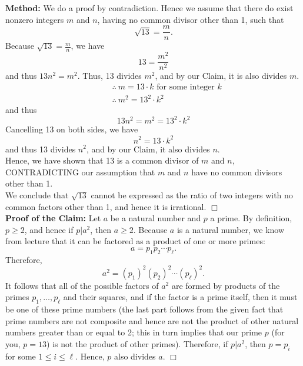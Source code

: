 \documentclass[letterpaper]{article}
\begin{document}
\noindent \textbf{Method:} We do a proof by contradiction. Hence we assume that there do exist nonzero integers ${m}$ and ${n}$, having no common divisor other than 1, such that
$$\sqrt{13}=\frac{{m}}{{n}}.$$
Because $\sqrt{13}=\frac{{m}}{{n}}$, we have
$$13=\frac{{m}^2}{{n}^2}$$
and thus $13{n}^2={m}^2$. Thus, 13 divides ${m}^2$, and by our Claim, it is also divides ${m}$.
$$\begin{aligned}
&~~~~~~~~~~~\therefore~{m}=13\cdot k \text{     for some integer } k \\
&~~~~~~~~~~~\therefore~{m}^2=13^2\cdot k^2
\end{aligned}$$
and thus
$$ 13{n}^2={m}^2=13^2 \cdot k^2$$
Cancelling 13 on both sides, we have
$${n}^2=13\cdot k^2$$
and thus 13 divides ${n}^2$, and by our Claim, it also divides ${n}$.
\medskip \\
Hence, we have shown that 13 is a common divisor of ${m}$ and ${n}$, CONTRADICTING our assumption that ${m}$ and ${n}$ have no common divisors other than 1.
\medskip \\
We conclude that $\sqrt{13}$ cannot be expressed as the ratio of two integers with no common factors other than 1, and hence it is irrational. \hfill $\Box$\\

\noindent \textbf{Proof of the Claim:} Let $a$ be a natural number and $p$ a prime. By definition, $p\ge 2$, and hence if $p|a^2$, then $a\ge2$. Because $a$ is a natural number, we know from lecture that it can be factored as a product of one or more primes:
$$a = p_1 p_2 \cdots p_\ell.$$
Therefore,
$$a^2 = (p_1)^2 (p_2)^2 \cdots (p_\ell)^2.$$
It follows that all of the possible factors of $a^2$ are formed by products of the primes $p_1, \ldots, p_\ell$ and their squares, and if the factor is a prime itself, then it must be one of these prime numbers (the last part follows from the given fact that prime numbers are not composite and hence are not the product of other natural numbers greater than or equal to 2; this in turn implies that our prime $p$ (for you, $p=13$) is not the product of other primes). Therefore, if $p|a^2$, then $p=p_i$ for some $1 \le i \le \ell$. Hence, $p$ also divides $a$. \hfill $\Box$ \\
\end{document}
